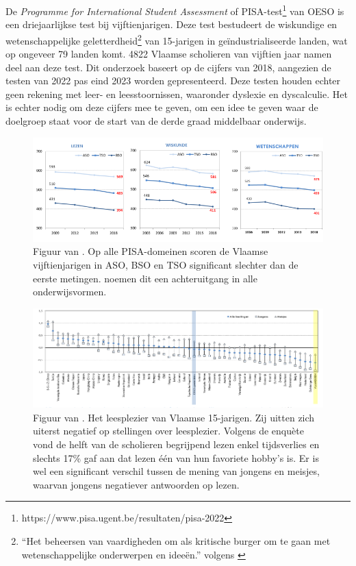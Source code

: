De \textit{Programme for International Student Assessment} of PISA-test\footnote{https://www.pisa.ugent.be/resultaten/pisa-2022} van OESO is een driejaarlijkse test bij vijftienjarigen. Deze test bestudeert de wiskundige en wetenschappelijke geletterdheid\footnote{“Het beheersen van vaardigheden om als kritische burger om te gaan met wetenschappelijke onderwerpen en ideeën.” volgens \textcite{DeMeyer2019}} van 15-jarigen in geïndustrialiseerde landen, wat op ongeveer 79 landen komt. 4822 Vlaamse scholieren van vijftien jaar namen deel aan deze test. Dit onderzoek baseert op de cijfers van 2018, aangezien de testen van 2022 pas eind 2023 worden gepresenteerd. Deze testen houden echter geen rekening met leer- en leesstoornissen, waaronder dyslexie en dyscalculie. Het is echter nodig om deze cijfers mee te geven, om een idee te geven waar de doelgroep staat voor de start van de derde graad middelbaar onderwijs. 

\begin{figure}[H]
	\begin{center}
		\includegraphics[width=\linewidth]{img/oeso-graphic-pisa-trend-samenvatting.png}
	\end{center}
	\caption{Figuur van \textcite{DeMeyer2019}. Op alle PISA-domeinen scoren de Vlaamse vijftienjarigen in ASO, BSO en TSO significant slechter dan de eerste metingen. \textcite{DeMeyer2019} noemen dit een achteruitgang in alle onderwijsvormen.}
\end{figure}

\begin{figure}[H]
	\begin{center}
		\includegraphics[width=\linewidth]{img/oeso-graphic-leesplezier.png}
	\end{center}
	\caption{Figuur van \textcite{DeMeyer2019}. Het leesplezier van Vlaamse 15-jarigen. Zij uitten zich uiterst negatief op stellingen over leesplezier. Volgens de enquète vond de helft van de scholieren begrijpend lezen enkel tijdsverlies en slechts 17\% gaf aan dat lezen één van hun favoriete hobby's is. Er is wel een significant verschil tussen de mening van jongens en meisjes, waarvan jongens negatiever antwoorden op lezen.}
\end{figure}

